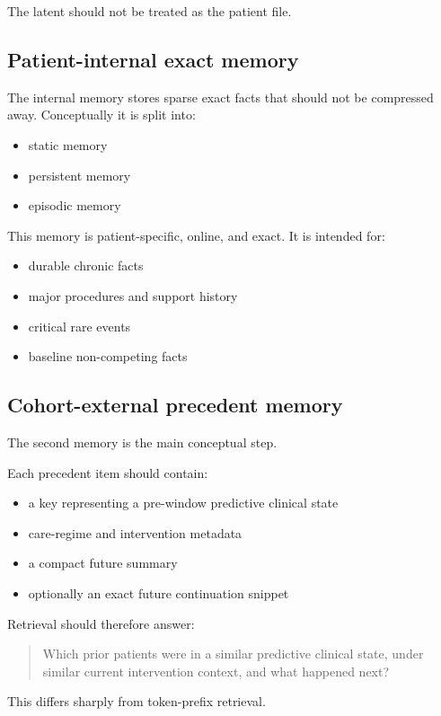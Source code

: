 \documentclass[11pt]{article}
\begin{document}
The latent should not be treated as the patient file.

\subsection{Patient-internal exact memory}

The internal memory stores sparse exact facts that should not be compressed away.
Conceptually it is split into:
\begin{itemize}
    \item static memory
    \item persistent memory
    \item episodic memory
\end{itemize}

This memory is patient-specific, online, and exact. It is intended for:
\begin{itemize}
    \item durable chronic facts
    \item major procedures and support history
    \item critical rare events
    \item baseline non-competing facts
\end{itemize}

\subsection{Cohort-external precedent memory}

The second memory is the main conceptual step.

Each precedent item should contain:
\begin{itemize}
    \item a key representing a pre-window predictive clinical state
    \item care-regime and intervention metadata
    \item a compact future summary
    \item optionally an exact future continuation snippet
\end{itemize}

Retrieval should therefore answer:
\begin{quote}
Which prior patients were in a similar predictive clinical state, under similar
current intervention context, and what happened next?
\end{quote}

This differs sharply from token-prefix retrieval.
\end{document}
